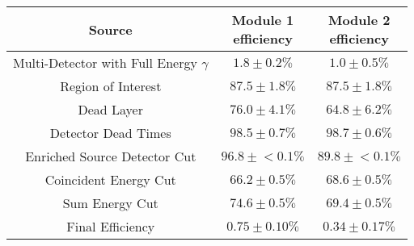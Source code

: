 \begin{tabular}{|c|c|c|}
\hline
  Source & \makecell{Module 1\\efficiency} & \makecell{Module 2\\efficiency} \\
\hline
  \makecell{Multi-Detector with\\Full Energy $\gamma$} & $1.8 \pm 0.2\%$ & $1.0 \pm 0.5\%$ \\
  Region of Interest & $87.5 \pm 1.8\%$ & $87.5 \pm 1.8\%$ \\
  Dead Layer & $76.0 \pm 4.1\%$ & $64.8 \pm 6.2\%$ \\
  Detector Dead Times & $98.5 \pm 0.7\%$ & $98.7 \pm 0.6\%$ \\
  Enriched Source Detector Cut & $96.8 \pm{}<\!0.1\%$ & $89.8 \pm{}<\!0.1\%$ \\
  Coincident Energy Cut & $66.2 \pm 0.5\%$ & $68.6 \pm 0.5\%$ \\
  Sum Energy Cut & $74.6 \pm 0.5\%$ & $69.4 \pm 0.5\%$ \\
  \hline Final Efficiency & $0.75 \pm 0.10\%$ & $0.34 \pm 0.17\%$ \\
\hline
\end{tabular}
